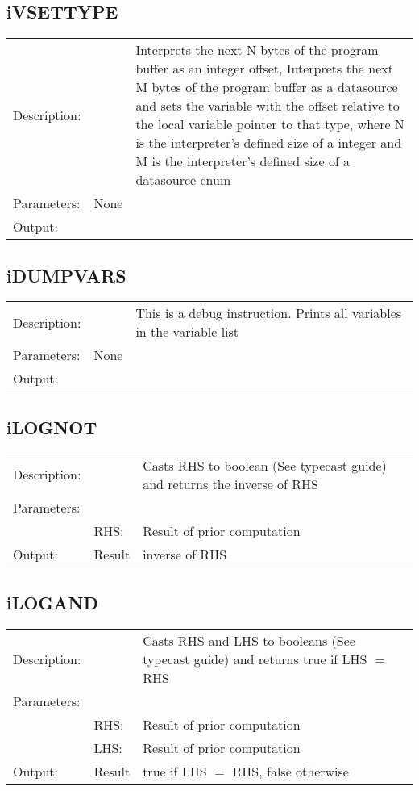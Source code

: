 \documentclass{report}
\begin{document}
\subsection{iVSETTYPE}
\begin{tabular}{l l p{10cm}}
Description: & ~    & Interprets the next N bytes of the program buffer as an integer offset, Interprets the next M bytes of the program buffer as a datasource and sets the variable with the offset relative to the local variable pointer to that type, where N is the interpreter's defined size of a integer and M is the interpreter's defined size of a datasource enum\\
Parameters:  & None & ~ \\
Output:      & ~ & ~\\
\end{tabular}

\subsection{iDUMPVARS}
\begin{tabular}{l l p{10cm}}
Description: & ~    & This is a debug instruction. Prints all variables in the variable list\\
Parameters:  & None & ~ \\
Output:      & ~ & ~\\
\end{tabular}

\subsection{iLOGNOT}
\begin{tabular}{l l p{10cm}}
Description: & ~    & Casts RHS to boolean (See typecast guide) and returns the inverse of RHS\\
Parameters:  & ~ & ~ \\
~			 & RHS: & Result of prior computation\\
Output:      & Result & inverse of RHS\\
\end{tabular}

\subsection{iLOGAND}
\begin{tabular}{l l p{10cm}}
Description: & ~    & Casts RHS and LHS to booleans (See typecast guide) and returns true if LHS $=$ RHS\\
Parameters:  & ~ & ~ \\
~			 & RHS: & Result of prior computation\\
~			 & LHS: & Result of prior computation\\
Output:      & Result & true if LHS $=$ RHS, false otherwise\\
\end{tabular}
\end{document}
